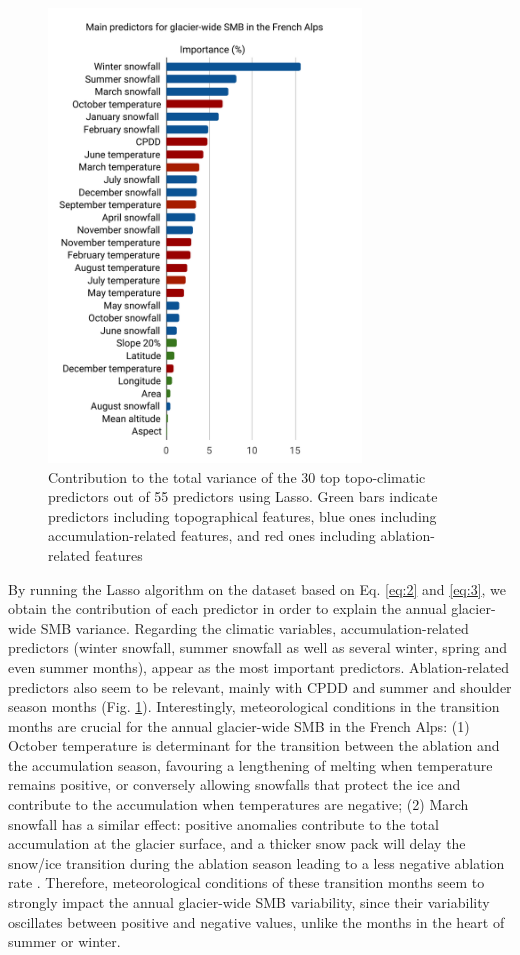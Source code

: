 \begin{figure}
\centering
\includegraphics[width=8.3cm]{Figures/methods/Figure_5.pdf}
\caption{Contribution to the total variance of the 30 top topo-climatic predictors out of 55 predictors using Lasso. Green bars indicate predictors including topographical features, blue ones including accumulation-related features, and red ones including ablation-related features}
\label{methods:fig5}
\end{figure}

By running the Lasso algorithm on the dataset based on Eq. \ref{eq:2} and \ref{eq:3}, we obtain the contribution of each predictor in order to explain the annual glacier-wide SMB variance. Regarding the climatic variables, accumulation-related predictors (winter snowfall, summer snowfall as well as several winter, spring and even summer months), appear as the most important predictors. Ablation-related predictors also seem to be relevant, mainly with CPDD and summer and shoulder season months (Fig. \ref{methods:fig5}). Interestingly, meteorological conditions in the transition months are crucial for the annual glacier-wide SMB in the French Alps: (1) October temperature is determinant for the transition between the ablation and the accumulation season, favouring a lengthening of melting when temperature remains positive, or conversely allowing snowfalls that protect the ice and contribute to the accumulation when temperatures are negative; (2) March snowfall has a similar effect: positive anomalies contribute to the total accumulation at the glacier surface, and a thicker snow pack will delay the snow/ice transition during the ablation season leading to a less negative ablation rate \citep[e.g. Fig. \ref{methods:fig6}b,][]{reveillet_relative_2018}. Therefore, meteorological conditions of these transition months seem to strongly impact the annual glacier-wide SMB variability, since their variability oscillates between positive and negative values, unlike the months in the heart of summer or winter. 

